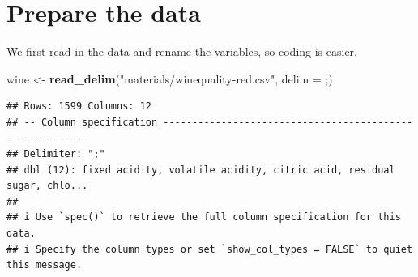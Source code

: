 \documentclass[
]{book}
\newenvironment{Shaded}{\begin{snugshade}}{\end{snugshade}}
\newcommand{\AttributeTok}[1]{\textcolor[rgb]{0.13,0.29,0.53}{#1}}
\newcommand{\ConstantTok}[1]{\textcolor[rgb]{0.56,0.35,0.01}{#1}}
\newcommand{\FunctionTok}[1]{\textcolor[rgb]{0.13,0.29,0.53}{\textbf{#1}}}
\newcommand{\NormalTok}[1]{#1}
\newcommand{\OtherTok}[1]{\textcolor[rgb]{0.56,0.35,0.01}{#1}}
\newcommand{\SpecialCharTok}[1]{\textcolor[rgb]{0.81,0.36,0.00}{\textbf{#1}}}
\newcommand{\StringTok}[1]{\textcolor[rgb]{0.31,0.60,0.02}{#1}}
\begin{document}
\begin{Shaded}
\end{Shaded}

\hypertarget{prepare-the-data}{%
\section{Prepare the data}\label{prepare-the-data}}

We first read in the data and rename the variables, so coding is easier.

\begin{Shaded}
\begin{Highlighting}[]
\NormalTok{wine }\OtherTok{\textless{}{-}} \FunctionTok{read\_delim}\NormalTok{(}\StringTok{"materials/winequality{-}red.csv"}\NormalTok{, }\AttributeTok{delim =} \StringTok{\textquotesingle{};\textquotesingle{}}\NormalTok{)}
\end{Highlighting}
\end{Shaded}

\begin{verbatim}
## Rows: 1599 Columns: 12
## -- Column specification --------------------------------------------------------
## Delimiter: ";"
## dbl (12): fixed acidity, volatile acidity, citric acid, residual sugar, chlo...
## 
## i Use `spec()` to retrieve the full column specification for this data.
## i Specify the column types or set `show_col_types = FALSE` to quiet this message.
\end{verbatim}
\end{document}
